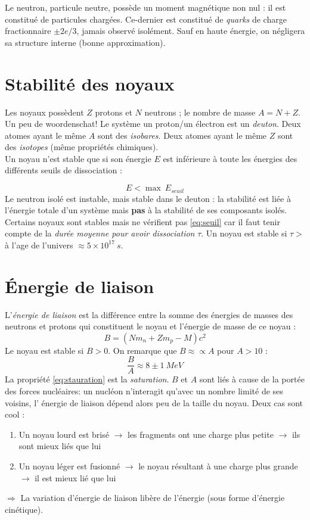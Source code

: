\documentclass	[11pt, a4paper, openany]{book}
\begin{document}
Le neutron, particule neutre, possède un moment magnétique non nul : il est constitué de particules
chargées. Ce-dernier est constitué de \textit{quarks} de charge fractionnaire $\pm 2e/3$, jamais 
observé isolément. Sauf en haute énergie, on négligera sa structure interne (bonne approximation).

\section{Stabilité des noyaux}
Les noyaux possèdent $Z$ protons et $N$ neutrons ; le nombre de masse $A = N + Z$. Un peu de 
woordenschat! Le système un proton/un électron est un \textit{deuton}. Deux atomes ayant le même 
$A$ sont des \textit{isobares}. Deux atomes ayant le même $Z$ sont des \textit{isotopes} (même 
propriétés chimiques).\\
Un noyau n'est stable que si son énergie $E$ est inférieure à toute les énergies des différents 
seuils de dissociation : 

\begin{equation}
E < \max\ E_{seuil}
\label{eq:seuil}
\end{equation}
Le neutron isolé est instable, mais stable dans le deuton : la stabilité est liée à l'énergie 
totale d'un système mais \textbf{pas} à la stabilité de ses composants isolés. \\
Certains noyaux sont stables mais ne vérifient pas \autoref{eq:seuil} car il faut tenir compte 
de la \textit{durée moyenne pour avoir dissociation} $\tau$. Un noyau est stable si $\tau >$ à
l'age de l'univers $\approx 5\times10^{17}\ s$.


\section{Énergie de liaison}
L'\textit{énergie de liaison} est la différence entre la somme des énergies de masses des neutrons 
et protons qui constituent le noyau et l'énergie de masse de ce noyau : 
\begin{equation}
B = (Nm_n + Zm_p - M)c^2
\end{equation}
Le noyau est stable si $B>0$. On remarque que $B \approx\propto A$ pour $A>10$ :
\begin{equation}
\frac{B}{A} \approx 8 \pm 1\ MeV
\label{eq:stauration}
\end{equation}
La propriété \autoref{eq:stauration} est la \textit{saturation}. $B$ et $A$ sont liés à cause de la 
portée des forces nucléaires: un nucléon n’interagit qu'avec un nombre limité de ses voisins, l'
énergie de liaison dépend alors peu de la taille du noyau. Deux cas sont cool :
\begin{enumerate}
\item Un noyau lourd est brisé $\rightarrow$ les fragments ont une charge plus petite $\rightarrow$ ils
sont mieux liés que lui
\item Un noyau léger est fusionné $\rightarrow$ le noyau résultant à une charge plus grande$\rightarrow$
il est mieux lié que lui
\end{enumerate}
$\Rightarrow$ La variation d'énergie de liaison libère de l'énergie (sous forme d'énergie cinétique).
\end{document}
